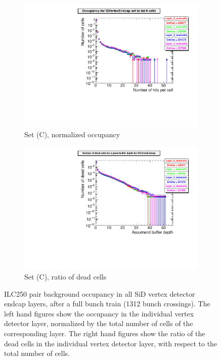 \begin{figure}[htb]
\begin{subfigure}[b]{0.49\textwidth}
    \includegraphics[width=\textwidth]{Figures/Pairs/occupancy_numcells_SiVertexEndcap_ILC250_SetC.pdf}
   \caption{Set (C), normalized occupancy}
   \end{subfigure}
   \hfill
    \begin{subfigure}[b]{0.49\textwidth}
   \centering
    \includegraphics[width=\textwidth]{Figures/Pairs/occupancy_deadcells_SiVertexEndcap_ILC250_SetC.pdf}
   \caption{Set (C), ratio of dead cells}
   \end{subfigure}
   \caption[Pair background occupancy in all SiD vertex detector endcap layers for the ILC250]{ILC250 pair background occupancy in all SiD vertex detector endcap layers, after a full bunch train (1312 bunch crossings).
   The left hand figures show the occupancy in the individual vertex detector layer, normalized by the total number of cells of the corresponding layer.
   The right hand figures show the ratio of the dead cells in the individual vertex detector layer, with respect to the total number of cells.
   }
   \label{fig:PairBkg:ILC250_Occupancy_Layers_VXDEndcap}
 \end{figure}

